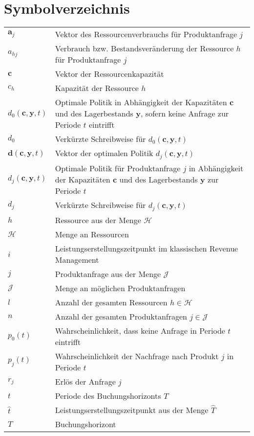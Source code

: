 \documentclass[a4paper,12pt,normalheadings,footexclude,headinclude,liststotoc,nochapterprefix,onecolumn,oneside,parskip,pointlessnumbers]{scrreprt}
\begin{document}
\chapter*{Symbolverzeichnis}
\begin{table}[h!]
    \vspace*{-3mm}
    \hspace*{2mm}
  \renewcommand{\arraystretch}{1,5}
  \begin{flushleft}
    \begin{tabular}{lp{11.5cm}}  %
    $\textbf{a}_{j}$ & Vektor des Ressourcenverbrauchs für Produktanfrage $j$\\
    $a_{hj}$ &	Verbrauch bzw. Bestandsveränderung der Ressource $h$ für Produktanfrage $j$\\
   $\textbf{c}$ & Vektor der Ressourcenkapazität\\
   $c_{h}$ & Kapazität der Ressource $h$\\
   $d_0(\textbf{c},\textbf{y},t)$ & Optimale Politik in Abhängigkeit der Kapazitäten $\textbf{c}$ und des Lagerbestands \textbf{y}, sofern keine Anfrage zur Periode $t$ eintrifft\\
   $d_0$ & Verkürzte Schreibweise für $d_0(\textbf{c},\textbf{y},t)$ \\
            $\textbf{d}(\textbf{c},\textbf{y},t)$ & Vektor der optimalen Politik $d_j(\textbf{c},\textbf{y},t)$\\
      $d_j(\textbf{c},\textbf{y},t)$ & Optimale Politik für Produktanfrage $j$ in Abhängigkeit der Kapazitäten $\textbf{c}$ und des Lagerbestands \textbf{y} zur Periode $t$\\
      $d_j$ & Verkürzte Schreibweise für $d_j(\textbf{c},\textbf{y},t)$\\
    $h$	& Ressource aus der Menge $\mathcal{H}$\\
    $\mathcal{H}$ & Menge an Ressourcen\\
    $i$ & Leistungserstellungszeitpunkt im klassischen Revenue Management\\
    $j$ & Produktanfrage aus der Menge $\mathcal{J}$\\
$\mathcal{J}$ & Menge an möglichen Produktanfragen \\   
$l$ & Anzahl der gesamten Ressourcen $h\in\mathcal{H}$\\
$n$ & Anzahl der gesamten Produktanfragen $j\in\mathcal{J}$\\
   $p_{0}(t)$ & Wahrscheinlichkeit, dass keine Anfrage in Periode $t$ eintrifft\\
   $p_{j}(t)$ & Wahrscheinlichkeit der Nachfrage nach Produkt $j$ in Periode $t$\\
    $r_{j}$ & Erlös der Anfrage $j$\\
            $t$ & Periode des Buchungshorizonts $T$\\
    $\hat t$ & Leistungserstellungszeitpunkt aus der Menge $\hat T$\\
            $T$ & Buchungshorizont\\
	\end{tabular}
	\end{flushleft}
\end{table}
\end{document}
